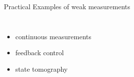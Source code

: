 \documentclass[
]{beamer}
\begin{document}
\begin{frame}{Practical Examples of weak measurements}
	\begin{columns}
		\begin{itemize}
			\item continuous measurements\\
			\item<2-> feedback control
			\item<3-> state tomography
		\end{itemize}
		

\end{columns}
\end{frame}
\end{document}
